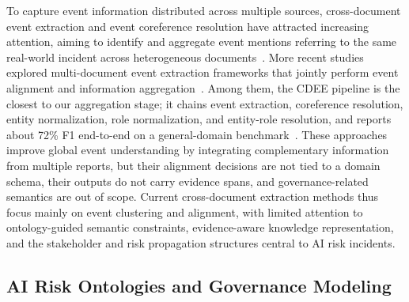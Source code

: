 \documentclass[a4paper,fleqn]{cas-dc}
\begin{document}
To capture event information distributed across multiple sources, cross-document
event extraction and event coreference resolution have attracted increasing
attention, aiming to identify and aggregate event mentions referring to the
same real-world incident across heterogeneous
documents~\cite{cybulska2015bag}.
More recent studies explored multi-document event extraction frameworks that
jointly perform event alignment and information
aggregation~\cite{gao-etal-2024-harvesting}.
Among them, the CDEE pipeline is the closest to our aggregation stage;
it chains event extraction, coreference resolution, entity
normalization, role normalization, and entity-role resolution, and
reports about 72\% F1 end-to-end on a general-domain
benchmark~\cite{gao-etal-2024-harvesting}.
These approaches improve global event understanding by integrating complementary
information from multiple reports, but their alignment decisions are
not tied to a domain schema, their outputs do not carry evidence
spans, and governance-related semantics are out of scope.
Current cross-document extraction methods thus focus mainly on event
clustering and alignment, with limited attention to ontology-guided
semantic constraints, evidence-aware knowledge
representation, and the stakeholder and risk
propagation structures central to AI risk incidents.

\subsection{AI Risk Ontologies and Governance Modeling}
\end{document}
